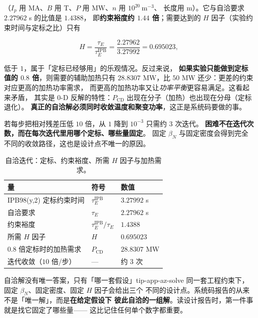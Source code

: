 （$I_p$ 用 MA、$B$ 用 T、$P$ 用 MW、$n$ 用 $10^{20}\ \mathrm{m^{-3}}$、
长度用 m）。它与自洽要求 $2.27962$ s 的比值是 $1.4388$，
即\textbf{约束裕度约 $1.44$ 倍}；需要达到的
$H$ 因子（实验约束时间与定标之比）只有

\begin{equation}
H=\frac{\tau_E}{\tau_E^\mathrm{IPB}}=\frac{2.27962}{3.27992}=0.695023,
\label{eq:app-az-h}
\end{equation}

低于 $1$，属于「定标已经够用」的乐观情况。反过来说，
\textbf{如果实验只能做到定标值的 $0.8$ 倍}，则需要的辅助加热只有
$28.8307$ MW，比 $50$ MW 还少：更差的约束对应更高的加热功率需求，
而更高的加热功率又让\emph{功率平衡}更容易满足。这看起来矛盾，
其实是 0-D 反解的特性：$P_\mathrm{CD}$ 出现在分子（加热）也出现在分母（定标退化）。
\textbf{真正的自洽解必须同时收敛温度和聚变功率}，这正是系统码要做的事。

若每步把相对残差压低 $10$ 倍，从 $1$ 降到 $10^{-3}$ 只需约 $3$ 次迭代。
\textbf{困难不在迭代次数，而在每次迭代里用哪个定标、哪些量固定}。
固定 $\beta_N$ 与固定密度会得到完全不同的收敛路径，这也是设计点不唯一的原因。

\begin{table}[htbp]
\centering
\small
\setlength{\tabcolsep}{4pt}
\caption{自洽迭代：定标、约束裕度、所需 $H$ 因子与加热需求。}
\label{tab:app-az-solve}
\begin{tabular}{p{4.8cm}p{2.8cm}p{3.4cm}}
\toprule
量 & 符号 & 数值 \\
\midrule
IPB98(y,2) 定标约束时间 & $\tau_E^\mathrm{IPB}$ & $3.27992$ s \\
自洽要求 & $\tau_E$ & $2.27962$ s \\
约束裕度 & $\tau_E^\mathrm{IPB}/\tau_E$ & $1.4388$ \\
所需 $H$ 因子 & $H$ & $0.695023$ \\
$0.8$ 倍定标时的加热需求 & $P_\mathrm{CD}$ & $28.8307$ MW \\
迭代收敛（$10$ 倍/步） & --- & 约 $3$ 次 \\
\bottomrule
\end{tabular}

\end{table}

\begin{tip}{自洽解没有唯一答案，只有「哪一套假设」}{tip-app-az-solve}
同一套工程约束下，固定 $\beta_N$、固定密度、固定 $H$ 因子会给出三个
不同的设计点。系统码报告的从来不是「唯一解」，而是\textbf{在给定假设下
彼此自洽的一组解}。读设计报告时，第一件事就是找它固定了哪些量——
这比记住任何单个数字都重要。
\end{tip}

